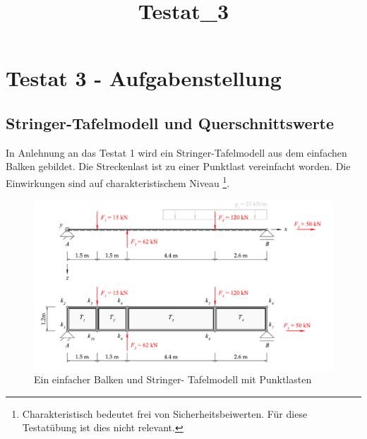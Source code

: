 \documentclass[
  12pt,
  letterpaper,
  DIV=11,
  egregdoesnotlikesansseriftitles]{scrartcl}
\title{Testat\_3}
\author{}
\date{}
\renewcommand{\maketitle}{}
\begin{document}
\maketitle
\ifdefined\Shaded\renewenvironment{Shaded}{\begin{tcolorbox}[frame hidden, borderline west={3pt}{0pt}{shadecolor}, breakable, boxrule=0pt, interior hidden, enhanced, sharp corners]}{\end{tcolorbox}}\fi

\hypertarget{testat-3---aufgabenstellung}{%
\section{Testat 3 -
Aufgabenstellung}\label{testat-3---aufgabenstellung}}

\hypertarget{stringer-tafelmodell-und-querschnittswerte}{%
\subsection{Stringer-Tafelmodell und
Querschnittswerte}\label{stringer-tafelmodell-und-querschnittswerte}}

In Anlehnung an das Testat 1 wird ein Stringer-Tafelmodell aus dem
einfachen Balken gebildet. Die Streckenlast ist zu einer Punktlast
vereinfacht worden. Die Einwirkungen sind auf charakteristischem Niveau
\footnote{Charakteristisch bedeutet frei von Sicherheitsbeiwerten. Für
  diese Testatübung ist dies nicht relevant.}.

\begin{figure}[H]

{\centering \includegraphics{BSI_HS23_Testat_03_files/mediabag/../images/Testat_03_HS23.pdf}

}

\caption{\label{fig-system}Ein einfacher Balken und Stringer-
Tafelmodell mit Punktlasten}

\end{figure}
\end{document}
